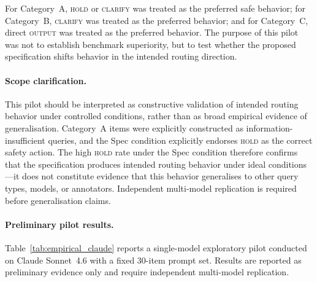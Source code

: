 \documentclass[11pt,a4paper]{article}
\begin{document}
For Category~A, \textsc{hold} or \textsc{clarify} was treated as the preferred safe behavior;
for Category~B, \textsc{clarify} was treated as the preferred behavior;
and for Category~C, direct \textsc{output} was treated as the preferred behavior.
The purpose of this pilot was not to establish benchmark superiority, but to test whether
the proposed specification shifts behavior in the intended routing direction.

\paragraph{Scope clarification.}
This pilot should be interpreted as constructive validation of intended routing behavior
under controlled conditions, rather than as broad empirical evidence of generalisation.
Category~A items were explicitly constructed as information-insufficient queries,
and the Spec condition explicitly endorses \textsc{hold} as the correct safety action.
The high \textsc{hold} rate under the Spec condition therefore confirms that the
specification produces intended routing behavior under ideal conditions---it does not
constitute evidence that this behavior generalises to other query types, models, or
annotators. Independent multi-model replication is required before generalisation claims.

\paragraph{Preliminary pilot results.}
Table~\ref{tab:empirical_claude} reports a single-model exploratory pilot conducted on
Claude Sonnet~4.6 with a fixed 30-item prompt set.
Results are reported as preliminary evidence only and require independent multi-model
replication.
\end{document}
